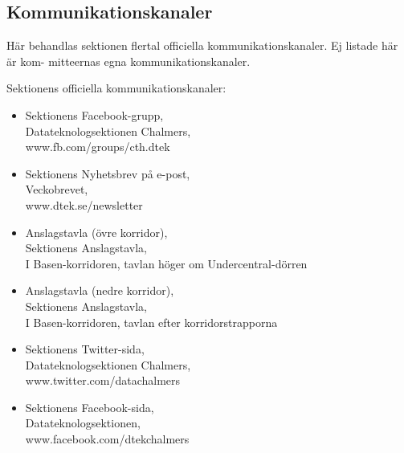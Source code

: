\subsection{Kommunikationskanaler}
Här behandlas sektionen flertal officiella kommunikationskanaler. Ej listade här är kom-
mitteernas egna kommunikationskanaler.

Sektionens officiella kommunikationskanaler:
\begin{itemize}
    \item Sektionens Facebook-grupp,\\
Datateknologsektionen Chalmers,\\
www.fb.com/groups/cth.dtek
    \item Sektionens Nyhetsbrev på e-post,\\
Veckobrevet,\\
www.dtek.se/newsletter
    \item Anslagstavla (övre korridor),\\
Sektionens Anslagstavla,\\
I Basen-korridoren, tavlan höger om Undercentral-dörren
    
    \item Anslagstavla (nedre korridor),\\
Sektionens Anslagstavla,\\
I Basen-korridoren, tavlan efter korridorstrapporna
    \item Sektionens Twitter-sida,\\
Datateknologsektionen Chalmers,\\
www.twitter.com/datachalmers
    \item Sektionens Facebook-sida,\\
Datateknologsektionen,\\
www.facebook.com/dtekchalmers

\end{itemize}
